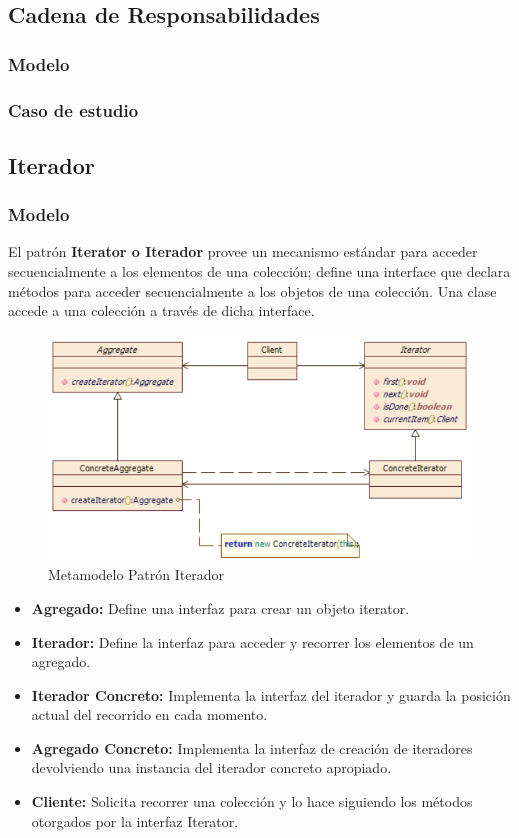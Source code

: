 \subsection{Cadena de Responsabilidades}
\subsubsection{Modelo}
\newpage
\subsubsection{Caso de estudio}
\newpage

\subsection{Iterador}
\subsubsection{Modelo}
El patrón \textbf{Iterator o Iterador} provee un mecanismo estándar para acceder secuencialmente a los elementos de una colección; define una interface que declara métodos para acceder secuencialmente a los objetos de una colección. Una clase accede a una colección a través de dicha interface.

\begin{figure}[th!]
	\centering
	\includegraphics[width=0.8\linewidth]{arquitectura/imagenes/modeloIterador}
	\caption{Metamodelo Patrón Iterador}
	\label{fig:metamodelo patron iterador}
\end{figure}

\begin{itemize}
	\item \textbf{Agregado: }Define una interfaz para crear un objeto iterator.
	\item \textbf{Iterador: }Define la interfaz para acceder y recorrer los elementos de un agregado.
	\item \textbf{Iterador Concreto: }Implementa la interfaz del iterador y guarda la posición actual del recorrido en cada momento.
	\item \textbf{Agregado Concreto: }Implementa la interfaz de creación de iteradores devolviendo una instancia del iterador concreto apropiado.
	\item \textbf{Cliente: }Solicita recorrer una colección y lo hace siguiendo los métodos otorgados por la interfaz Iterator. 
\end{itemize}

